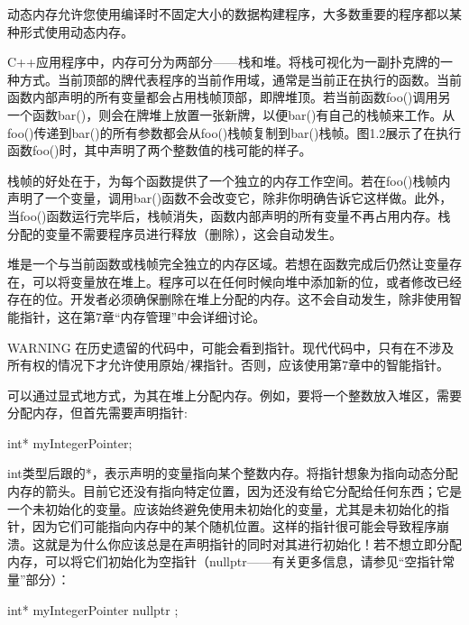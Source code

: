 
动态内存允许您使用编译时不固定大小的数据构建程序，大多数重要的程序都以某种形式使用动态内存。


C++应用程序中，内存可分为两部分——栈和堆。将栈可视化为一副扑克牌的一种方式。当前顶部的牌代表程序的当前作用域，通常是当前正在执行的函数。当前函数内部声明的所有变量都会占用栈帧顶部，即牌堆顶。若当前函数foo()调用另一个函数bar()，则会在牌堆上放置一张新牌，以便bar()有自己的栈帧来工作。从foo()传递到bar()的所有参数都会从foo()栈帧复制到bar()栈帧。图1.2展示了在执行函数foo()时，其中声明了两个整数值的栈可能的样子。


栈帧的好处在于，为每个函数提供了一个独立的内存工作空间。若在foo()栈帧内声明了一个变量，调用bar()函数不会改变它，除非你明确告诉它这样做。此外，当foo()函数运行完毕后，栈帧消失，函数内部声明的所有变量不再占用内存。栈分配的变量不需要程序员进行释放（删除），这会自动发生。

堆是一个与当前函数或栈帧完全独立的内存区域。若想在函数完成后仍然让变量存在，可以将变量放在堆上。程序可以在任何时候向堆中添加新的位，或者修改已经存在的位。开发者必须确保删除在堆上分配的内存。这不会自动发生，除非使用智能指针，这在第7章“内存管理”中会详细讨论。

\begin{myWarning}{WARNING}
在历史遗留的代码中，可能会看到指针。现代代码中，只有在不涉及所有权的情况下才允许使用原始/裸指针。否则，应该使用第7章中的智能指针。
\end{myWarning}


可以通过显式地方式，为其在堆上分配内存。例如，要将一个整数放入堆区，需要分配内存，但首先需要声明指针:

\begin{cpp}
int* myIntegerPointer;
\end{cpp}

int类型后跟的*，表示声明的变量指向某个整数内存。将指针想象为指向动态分配内存的箭头。目前它还没有指向特定位置，因为还没有给它分配给任何东西；它是一个未初始化的变量。应该始终避免使用未初始化的变量，尤其是未初始化的指针，因为它们可能指向内存中的某个随机位置。这样的指针很可能会导致程序崩溃。这就是为什么你应该总是在声明指针的同时对其进行初始化！若不想立即分配内存，可以将它们初始化为空指针（nullptr——有关更多信息，请参见“空指针常量”部分）：

\begin{cpp}
int* myIntegerPointer { nullptr };
\end{cpp}

